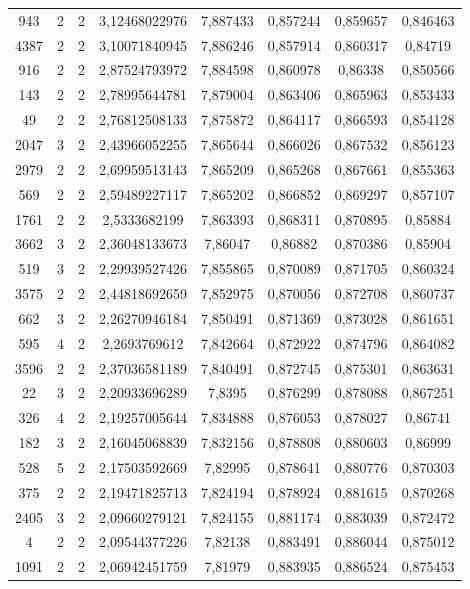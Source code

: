 \begin{longtable}{|c|c|c|c|c|c|c|c|}
943 & 2 & 2 & 3,12468022976 & 7,887433 & 0,857244 & 0,859657 & 0,846463 \\
4387 & 2 & 2 & 3,10071840945 & 7,886246 & 0,857914 & 0,860317 & 0,84719 \\
916 & 2 & 2 & 2,87524793972 & 7,884598 & 0,860978 & 0,86338 & 0,850566 \\
143 & 2 & 2 & 2,78995644781 & 7,879004 & 0,863406 & 0,865963 & 0,853433 \\
49 & 2 & 2 & 2,76812508133 & 7,875872 & 0,864117 & 0,866593 & 0,854128 \\
2047 & 3 & 2 & 2,43966052255 & 7,865644 & 0,866026 & 0,867532 & 0,856123 \\
2979 & 2 & 2 & 2,69959513143 & 7,865209 & 0,865268 & 0,867661 & 0,855363 \\
569 & 2 & 2 & 2,59489227117 & 7,865202 & 0,866852 & 0,869297 & 0,857107 \\
1761 & 2 & 2 & 2,5333682199 & 7,863393 & 0,868311 & 0,870895 & 0,85884 \\
3662 & 3 & 2 & 2,36048133673 & 7,86047 & 0,86882 & 0,870386 & 0,85904 \\
519 & 3 & 2 & 2,29939527426 & 7,855865 & 0,870089 & 0,871705 & 0,860324 \\
3575 & 2 & 2 & 2,44818692659 & 7,852975 & 0,870056 & 0,872708 & 0,860737 \\
662 & 3 & 2 & 2,26270946184 & 7,850491 & 0,871369 & 0,873028 & 0,861651 \\
595 & 4 & 2 & 2,2693769612 & 7,842664 & 0,872922 & 0,874796 & 0,864082 \\
3596 & 2 & 2 & 2,37036581189 & 7,840491 & 0,872745 & 0,875301 & 0,863631 \\
22 & 3 & 2 & 2,20933696289 & 7,8395 & 0,876299 & 0,878088 & 0,867251 \\
326 & 4 & 2 & 2,19257005644 & 7,834888 & 0,876053 & 0,878027 & 0,86741 \\
182 & 3 & 2 & 2,16045068839 & 7,832156 & 0,878808 & 0,880603 & 0,86999 \\
528 & 5 & 2 & 2,17503592669 & 7,82995 & 0,878641 & 0,880776 & 0,870303 \\
375 & 2 & 2 & 2,19471825713 & 7,824194 & 0,878924 & 0,881615 & 0,870268 \\
2405 & 3 & 2 & 2,09660279121 & 7,824155 & 0,881174 & 0,883039 & 0,872472 \\
4 & 2 & 2 & 2,09544377226 & 7,82138 & 0,883491 & 0,886044 & 0,875012 \\
1091 & 2 & 2 & 2,06942451759 & 7,81979 & 0,883935 & 0,886524 & 0,875453 \\

\end{longtable}
